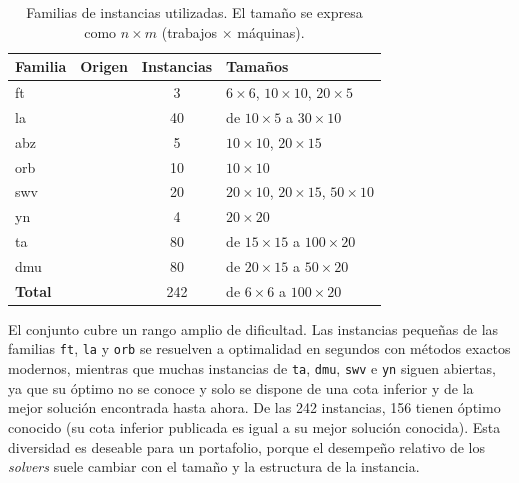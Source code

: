 \begin{table}[H]
  \centering
  \small
  \singlespacing
  \caption{Familias de instancias utilizadas. El tamaño se expresa como
  $n \times m$ (trabajos $\times$ máquinas).}
  \label{tab:familias}
  \begin{tabularx}{\textwidth}{>{\ttfamily}l >{\raggedright\arraybackslash}X
                               c >{\raggedright\arraybackslash}p{}}
    \toprule
    \normalfont\textbf{Familia} & \textbf{Origen} & \textbf{Instancias} & \textbf{Tamaños} \\
    \midrule
    ft  & \citet{fisher1963}         & 3  & $6\times6$, $10\times10$, $20\times5$ \\
    la  & \citet{lawrence1984}       & 40 & de $10\times5$ a $30\times10$ \\
    abz & \citet{adams1988}          & 5  & $10\times10$, $20\times15$ \\
    orb & \citet{applegate1991}      & 10 & $10\times10$ \\
    swv & \citet{storer1992}         & 20 & $20\times10$, $20\times15$, $50\times10$ \\
    yn  & \citet{yamada1992}         & 4  & $20\times20$ \\
    ta  & \citet{taillard1993}       & 80 & de $15\times15$ a $100\times20$ \\
    dmu & \citet{demirkol1998}       & 80 & de $20\times15$ a $50\times20$ \\
    \midrule
    \normalfont\textbf{Total} & & 242 & de $6\times6$ a $100\times20$ \\
    \bottomrule
  \end{tabularx}
  \par{}
\end{table}

El conjunto cubre un rango amplio de dificultad. Las instancias pequeñas de las
familias \texttt{ft}, \texttt{la} y \texttt{orb} se resuelven a optimalidad en
segundos con métodos exactos modernos, mientras que muchas instancias de
\texttt{ta}, \texttt{dmu}, \texttt{swv} e \texttt{yn} siguen abiertas, ya que
su óptimo no se conoce y solo se dispone de una cota inferior y de la mejor
solución encontrada hasta ahora. De las 242 instancias, 156 tienen óptimo
conocido (su cota inferior publicada es igual a su mejor solución conocida).
Esta diversidad es deseable para un portafolio, porque el desempeño relativo
de los \textit{solvers} suele cambiar con el tamaño y la estructura de la
instancia.

